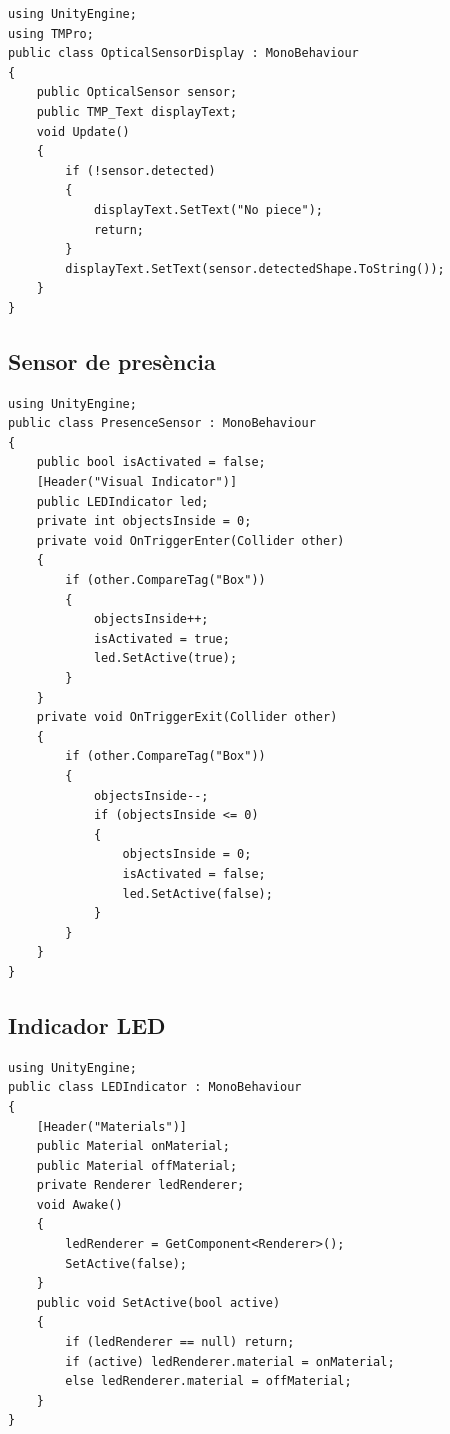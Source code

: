 \documentclass[a4paper,11pt,DIV=13,headings=normal,abstract=true,twoside=semi]{article}
\begin{document}
\begin{lstlisting}[style=modern, caption={Visualització del sensor òptic}, label={lst:opticalsensordisplay}]
using UnityEngine;
using TMPro;
public class OpticalSensorDisplay : MonoBehaviour
{
    public OpticalSensor sensor;    
    public TMP_Text displayText;    
    void Update()
    {
        if (!sensor.detected)
        {
            displayText.SetText("No piece");
            return;
        }
        displayText.SetText(sensor.detectedShape.ToString());
    }
}
\end{lstlisting}

\subsection*{Sensor de presència}

\begin{lstlisting}[style=modern, caption={Sensor de presència}, label={lst:presencesensor}]
using UnityEngine;
public class PresenceSensor : MonoBehaviour
{
    public bool isActivated = false;
    [Header("Visual Indicator")]
    public LEDIndicator led; 
    private int objectsInside = 0;
    private void OnTriggerEnter(Collider other)
    {
        if (other.CompareTag("Box"))
        {   
            objectsInside++;
            isActivated = true;
            led.SetActive(true);
        }
    }
    private void OnTriggerExit(Collider other)
    {
        if (other.CompareTag("Box"))
        {
            objectsInside--;
            if (objectsInside <= 0)
            {
                objectsInside = 0; 
                isActivated = false;
                led.SetActive(false);
            }
        }
    }
}    

\end{lstlisting}

\subsection*{Indicador LED}

\begin{lstlisting}[style=modern, caption={Indicador LED}, label={lst:ledindicator}]
using UnityEngine;
public class LEDIndicator : MonoBehaviour
{
    [Header("Materials")]
    public Material onMaterial;
    public Material offMaterial;
    private Renderer ledRenderer;
    void Awake()
    {
        ledRenderer = GetComponent<Renderer>();
        SetActive(false);
    }
    public void SetActive(bool active)
    {
        if (ledRenderer == null) return;
        if (active) ledRenderer.material = onMaterial;
        else ledRenderer.material = offMaterial;
    }
}
\end{lstlisting}
\end{document}
